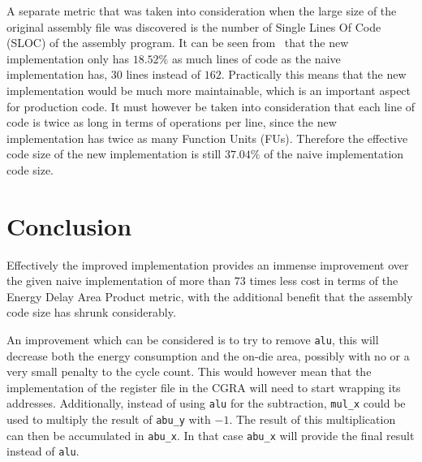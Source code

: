 \documentclass[10pt,twocolumn]{article}
\begin{document}
A separate metric that was taken into consideration when the large
size of the original assembly file was discovered is the number of
Single Lines Of Code (SLOC) of the assembly program. It can be seen
from~ that the new implementation only has $18.52\%$
as much lines of code as the naive implementation has, $30$ lines
instead of $162$. Practically this means that the new implementation
would be much more maintainable, which is an important aspect for
production code. It must however be taken into consideration that each
line of code is twice as long in terms of operations per line, since
the new implementation has twice as many Function Units (FUs).
Therefore the effective code size of the new implementation is still
$37.04\%$ of the naive implementation code size.


\section{Conclusion}
Effectively the improved implementation provides an immense
improvement over the given naive implementation of more than $73$
times less cost in terms of the Energy Delay Area Product metric, with
the additional benefit that the assembly code size has shrunk
considerably.

An improvement which can be considered is to try to remove
\texttt{alu}, this will decrease both the energy consumption and the
on-die area, possibly with no or a very small penalty to the cycle
count. This would however mean that the implementation of the register
file in the CGRA will need to start wrapping its addresses.
Additionally, instead of using \texttt{alu} for the subtraction,
\texttt{mul\_x} could be used to multiply the result of
\texttt{abu\_y} with $-1$. The result of this multiplication can then
be accumulated in \texttt{abu\_x}. In that case \texttt{abu\_x} will
provide the final result instead of \texttt{alu}.
\end{document}
